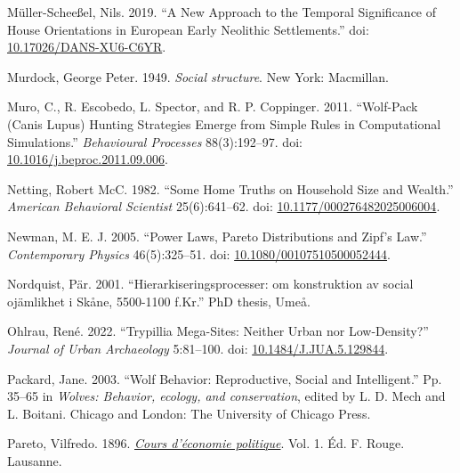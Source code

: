 \documentclass[
  12pt,
]{book}
\newlength{\cslhangindent}
\newlength{\cslentryspacingunit} %
\newenvironment{CSLReferences}[2] %
 {%
  \setlength{\parindent}{0pt}
  \ifodd #1
  \let\oldpar\par
  \def\par{\hangindent=\cslhangindent\oldpar}
  \fi
  \setlength{\parskip}{#2\cslentryspacingunit}
 }%
 {}
\begin{document}
\begin{CSLReferences}{1}{0}
\leavevmode{}%
Müller-Scheeßel, Nils. 2019. {``A New Approach to the Temporal Significance of House Orientations in European Early Neolithic Settlements.''} doi: \href{https://doi.org/10.17026/DANS-XU6-C6YR}{10.17026/DANS-XU6-C6YR}.

\leavevmode{}%
Murdock, George Peter. 1949. \emph{Social structure}. New York: Macmillan.

\leavevmode{}%
Muro, C., R. Escobedo, L. Spector, and R. P. Coppinger. 2011. {``Wolf-Pack (Canis Lupus) Hunting Strategies Emerge from Simple Rules in Computational Simulations.''} \emph{Behavioural Processes} 88(3):192--97. doi: \href{https://doi.org/10.1016/j.beproc.2011.09.006}{10.1016/j.beproc.2011.09.006}.

\leavevmode{}%
Netting, Robert McC. 1982. {``Some Home Truths on Household Size and Wealth.''} \emph{American Behavioral Scientist} 25(6):641--62. doi: \href{https://doi.org/10.1177/000276482025006004}{10.1177/000276482025006004}.

\leavevmode{}%
Newman, M. E. J. 2005. {``Power Laws, Pareto Distributions and Zipf's Law.''} \emph{Contemporary Physics} 46(5):325--51. doi: \href{https://doi.org/10.1080/00107510500052444}{10.1080/00107510500052444}.

\leavevmode{}%
Nordquist, Pär. 2001. {``Hierarkiseringsprocesser: om konstruktion av social ojämlikhet i Skåne, 5500-1100 f.Kr.''} PhD thesis, Umeå.

\leavevmode{}%
Ohlrau, René. 2022. {``Trypillia Mega-Sites: Neither Urban nor Low-Density?''} \emph{Journal of Urban Archaeology} 5:81--100. doi: \href{https://doi.org/10.1484/J.JUA.5.129844}{10.1484/J.JUA.5.129844}.

\leavevmode{}%
Packard, Jane. 2003. {``Wolf Behavior: Reproductive, Social and Intelligent.''} Pp. 35--65 in \emph{Wolves: Behavior, ecology, and conservation}, edited by L. D. Mech and L. Boitani. {Chicago and London}: {The University of Chicago Press}.

\leavevmode{}%
Pareto, Vilfredo. 1896. \emph{\href{http://archive.org/details/fp-0148-1}{Cours d'économie politique}}. Vol. 1. Éd. F. Rouge. Lausanne.


\end{CSLReferences}
\end{document}
